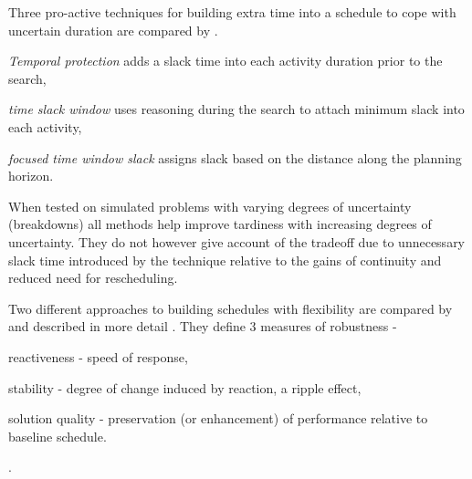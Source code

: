 Three pro-active techniques for building extra time into a schedule to cope with uncertain duration are compared by \citet{davenport01slack}. \begin{inparaenum} \item \emph{Temporal protection} adds a slack time into each activity duration prior to the search, \item \emph{time slack window} uses reasoning during the search to attach minimum slack into each activity, \item \emph{focused time window slack} assigns slack based on the distance along the planning horizon.\end{inparaenum}

When tested on simulated problems with varying degrees of uncertainty (breakdowns) all methods help improve tardiness with increasing degrees of uncertainty. They do not however give account of the tradeoff due to unnecessary slack time introduced by the technique relative to the gains of continuity and reduced need for rescheduling.


Two different approaches to building schedules with flexibility are compared by \citet{policella03flexible} and described in more detail \citep{policella05thesis}. 
They define 3 measures of robustness - \begin{inparaenum}\item reactiveness - speed of response, \item stability - degree of change induced by reaction, a ripple effect, \item solution quality - preservation (or enhancement) of performance relative to baseline schedule.\end{inparaenum}. 

